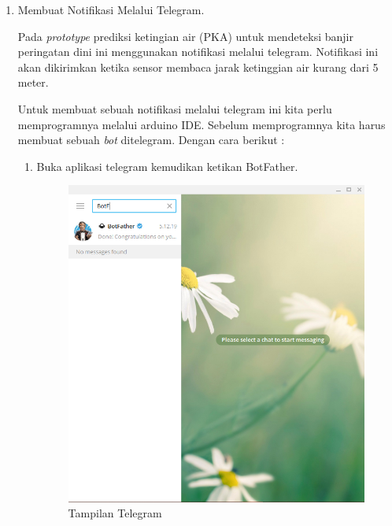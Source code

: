 \begin{enumerate}
    \item Membuat Notifikasi Melalui Telegram.
    \par Pada \textit{prototype} prediksi ketingian air (PKA) untuk mendeteksi banjir peringatan dini ini menggunakan notifikasi melalui telegram. Notifikasi ini akan dikirimkan ketika sensor membaca jarak ketinggian air kurang dari 5 meter.
    \\
    \par Untuk membuat sebuah notifikasi melalui telegram ini kita perlu memprogramnya melalui arduino IDE. Sebelum memprogramnya kita harus membuat sebuah \textit{bot} ditelegram. Dengan cara berikut :
    \begin{enumerate}
        \item Buka aplikasi telegram kemudikan ketikan BotFather.
         \begin{figure}[H]
    \centering
    \includegraphics[width=1\textwidth]{figures/bot1.png}
    \caption{Tampilan Telegram}
    \label{print}
    \end{figure}
    \\
    \\
    \\
    \\
    \\

\end{enumerate}
\end{enumerate}
